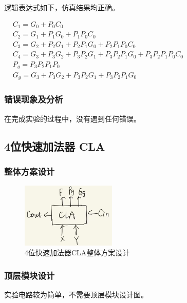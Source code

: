 \documentclass{article}
\begin{document}
    
    逻辑表达式如下，仿真结果均正确。
    
    $\begin{aligned}
        &C_1 =G_0 + P_0 C_0  \\
        &C_2 =G_1+P_1G_0+P_1P_0C_0  \\
        &C_3 =G_2+P_2G_1+P_2P_1G_0+P_2P_1P_0C_0  \\
        &C_4 =G_3+P_3G_2+P_3P_2G_1+P_3P_2P_1G_0+P_3P_2P_1P_0C_0  \\
        &P_g =P_3P_2P_1P_0  \\
        &G_g =G_3+P_3G_2+P_3P_2G_1+P_3P_2P_1G_0 
    \end{aligned}$

    \subsubsection{错误现象及分析}
    在完成实验的过程中，没有遇到任何错误。

    \subsection{4位快速加法器 CLA}

    \subsubsection{整体方案设计}
    \begin{figure}[H]
    \centering
    \includegraphics[width=0.4\textwidth]{2.1.png}
    \caption{4位快速加法器CLA整体方案设计}
    \end{figure}

    \subsubsection{顶层模块设计}
    实验电路较为简单，不需要顶层模块设计图。
\end{document}
